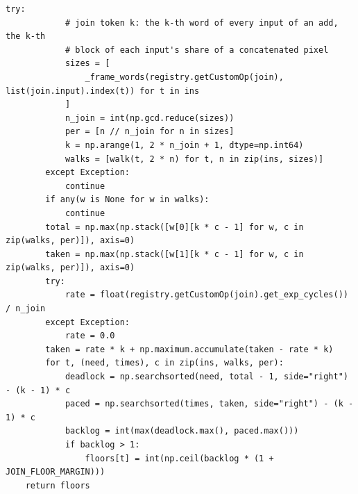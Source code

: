 \documentclass[10pt,a4paper]{article}
\begin{document}
\begin{lstlisting}[firstnumber=1097,title={\texttt{src/finn/transformation/fpgadataflow/derive\_characteristic.py}, lines 1097--1162}]
        try:
            # join token k: the k-th word of every input of an add, the k-th
            # block of each input's share of a concatenated pixel
            sizes = [
                _frame_words(registry.getCustomOp(join), list(join.input).index(t)) for t in ins
            ]
            n_join = int(np.gcd.reduce(sizes))
            per = [n // n_join for n in sizes]
            k = np.arange(1, 2 * n_join + 1, dtype=np.int64)
            walks = [walk(t, 2 * n) for t, n in zip(ins, sizes)]
        except Exception:
            continue
        if any(w is None for w in walks):
            continue
        total = np.max(np.stack([w[0][k * c - 1] for w, c in zip(walks, per)]), axis=0)
        taken = np.max(np.stack([w[1][k * c - 1] for w, c in zip(walks, per)]), axis=0)
        try:
            rate = float(registry.getCustomOp(join).get_exp_cycles()) / n_join
        except Exception:
            rate = 0.0
        taken = rate * k + np.maximum.accumulate(taken - rate * k)
        for t, (need, times), c in zip(ins, walks, per):
            deadlock = np.searchsorted(need, total - 1, side="right") - (k - 1) * c
            paced = np.searchsorted(times, taken, side="right") - (k - 1) * c
            backlog = int(max(deadlock.max(), paced.max()))
            if backlog > 1:
                floors[t] = int(np.ceil(backlog * (1 + JOIN_FLOOR_MARGIN)))
    return floors
\end{lstlisting}
\end{document}
